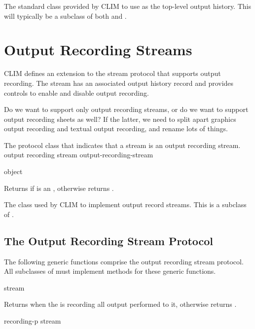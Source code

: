 
The standard class provided by CLIM to use as the top-level output history.
This will typically be a subclass of both  and
.


\section {Output Recording Streams}

CLIM defines an extension to the stream protocol that supports output recording.
The stream has an associated output history record and provides controls to
enable and disable output recording.

 {Do we want to support only output recording streams, or do we
want to support output recording sheets as well?  If the latter, we need to
split apart graphics output recording and textual output recording, and rename
lots of things.}


The protocol class that indicates that a stream is an output recording stream.
 {output recording stream} {output-recording-stream}

 {object}

Returns  if  is an ,
otherwise returns .


The class used by CLIM to implement output record streams.  This is a subclass
of .
\Mutable


\subsection {The Output Recording Stream Protocol}

The following generic functions comprise the output recording stream protocol.
All subclasses of  must implement methods for these
generic functions.

 {stream}

Returns  when the   is
recording all output performed to it, otherwise returns .

 {recording-p stream}

